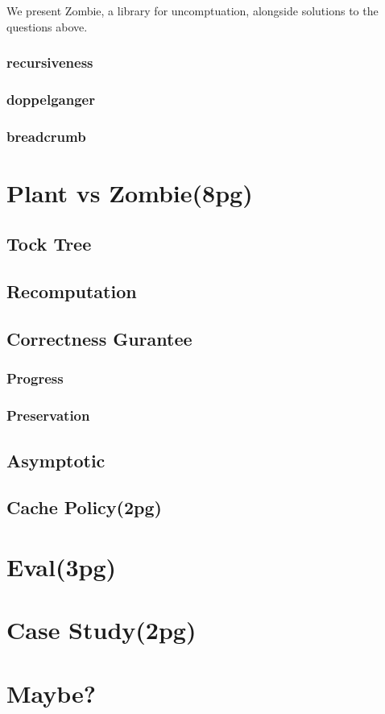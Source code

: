 \documentclass[acmsmall]{acmart}
\begin{document}
	We present Zombie, a library for uncomptuation, alongside solutions to the questions above.
	\subsubsection{recursiveness}
	\subsubsection{doppelganger}
	\subsubsection{breadcrumb}
	\section{Plant vs Zombie(8pg)}
	\subsection{Tock Tree}
	\subsection{Recomputation}
	\subsection{Correctness Gurantee}
	\subsubsection{Progress}
	\subsubsection{Preservation}
	\subsection{Asymptotic}
	\subsection{Cache Policy(2pg)}
	\section{Eval(3pg)}
	\section{Case Study(2pg)}
	
	\section{Maybe?}
\end{document}
